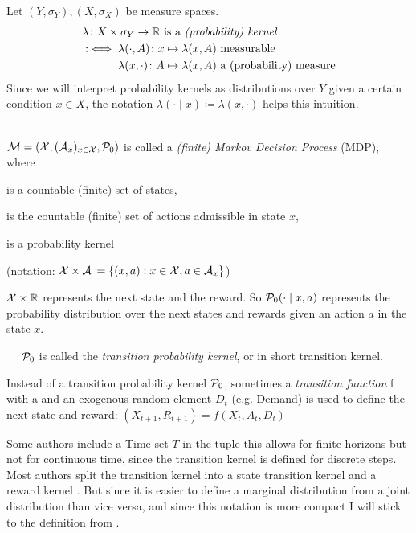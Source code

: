 \begin{definition}[Kernel]
	Let \((Y,\sigma_Y), (X,\sigma_X)\) be measure spaces.
	 \begin{align*}
	 &\lambda\colon X\times\sigma_Y\to \mathbb{R} \text{ is a \emph{(probability) kernel}}\\
	 &:\iff \begin{aligned}[t]
	 &\lambda(\cdot,A)\colon x\mapsto \lambda(x,A) \text{ measurable}\\
	 &\lambda(x,\cdot)\colon A\mapsto \lambda(x,A) \text{ a (probability) measure}
	 \end{aligned}
	  \end{align*}
	  Since we will interpret probability kernels as distributions over \(Y\) given a  certain condition \(x\in X\), the notation \(\lambda(\cdot\mid x) \coloneqq \lambda(x,\cdot)\) helps this intuition. 
\end{definition}

\begin{definition} \leavevmode \\ 
	\(\mathcal{M}=(\mathcal{X},(\mathcal{A}_x)_{x\in\mathcal{X}},\mathcal{P}_0) \) is called a \emph{(finite) Markov Decision Process} (MDP), where
	\begin{description}[noitemsep]
		\item[\(\cX\)] is a countable (finite) set of states,
		\item[\(\cA_x\)] is the countable (finite) set of actions admissible in state \(x\),
		\item[\(\cP_0\colon (\cX\times\cA) \times \sigma_{\cX\times\R} \to \R\)] is a probability kernel 
	\end{description}
	(notation: \(\mathcal{X}\times\mathcal{A}\coloneqq \{(x,a): x\in\mathcal{X}, a\in\mathcal{A}_x \} \))

	\(\mathcal{X}\times\mathbb{R}\) represents the next state and the reward. So \(\mathcal{P}_0(\cdot\mid x,a) \) represents the probability distribution over the next states and rewards given an action \(a\) in the state \(x\).

	\(\quad\) \(\mathcal{P}_0\) is called the \emph{transition probability kernel}, or in short transition kernel. 
\end{definition}
\begin{remark}
	Instead of a transition probability kernel \(\mathcal{P}_0\), sometimes a \emph{transition function} f with a and an exogenous random element \(D_t\) (e.g. Demand) is used to define the next state and reward: \((X_{t+1},R_{t+1})=f(X_t,A_t,D_t)\)

	Some authors include a Time set \(T\) in the tuple \parencite[e.g.][]{putermanMarkovDecisionProcesses2014} this allows for finite horizons but not for continuous time, since the transition kernel is defined for discrete steps. Most authors split the transition kernel into a state transition kernel and a reward kernel \parencite[e.g.][]{putermanMarkovDecisionProcesses2014}. But since it is easier to define a marginal distribution from a joint distribution than vice versa, and since this notation is more compact I will stick to the definition from \textcite{szepesvariAlgorithmsReinforcementLearning2010}.
\end{remark}

